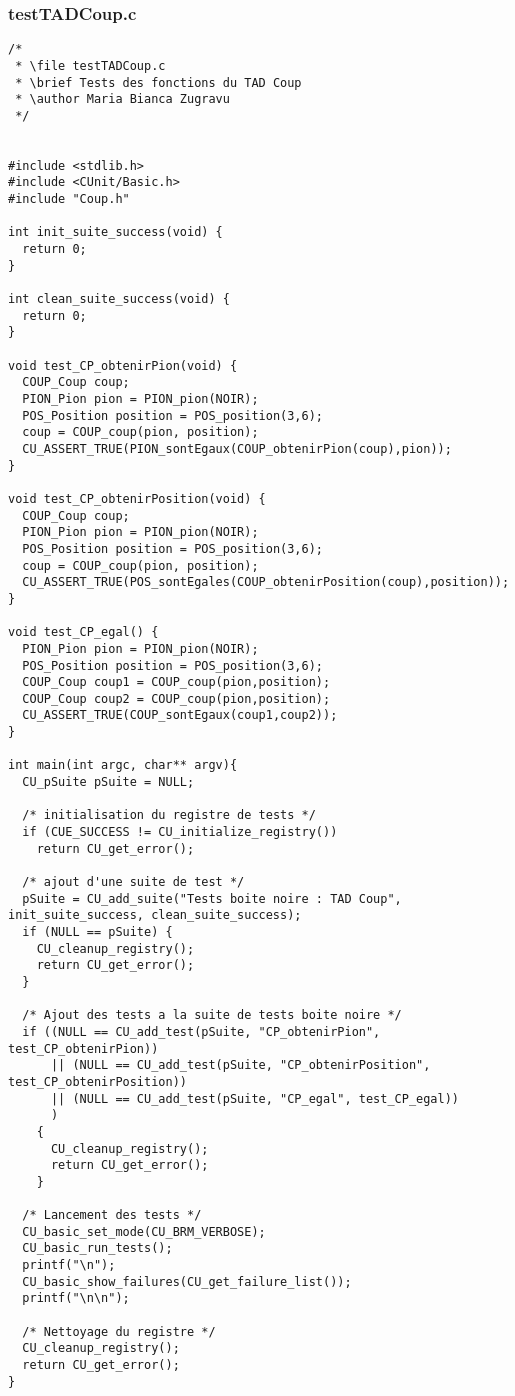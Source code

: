 \subsubsection{testTADCoup.c}
\begin{lstlisting}
/*
 * \file testTADCoup.c
 * \brief Tests des fonctions du TAD Coup
 * \author Maria Bianca Zugravu
 */


#include <stdlib.h>
#include <CUnit/Basic.h>
#include "Coup.h"

int init_suite_success(void) {
  return 0;
}

int clean_suite_success(void) {
  return 0;
}

void test_CP_obtenirPion(void) {
  COUP_Coup coup;
  PION_Pion pion = PION_pion(NOIR);
  POS_Position position = POS_position(3,6);
  coup = COUP_coup(pion, position);
  CU_ASSERT_TRUE(PION_sontEgaux(COUP_obtenirPion(coup),pion));
}

void test_CP_obtenirPosition(void) {
  COUP_Coup coup;
  PION_Pion pion = PION_pion(NOIR);
  POS_Position position = POS_position(3,6);
  coup = COUP_coup(pion, position);
  CU_ASSERT_TRUE(POS_sontEgales(COUP_obtenirPosition(coup),position));
}

void test_CP_egal() {
  PION_Pion pion = PION_pion(NOIR);
  POS_Position position = POS_position(3,6);
  COUP_Coup coup1 = COUP_coup(pion,position);
  COUP_Coup coup2 = COUP_coup(pion,position);
  CU_ASSERT_TRUE(COUP_sontEgaux(coup1,coup2));
}

int main(int argc, char** argv){
  CU_pSuite pSuite = NULL;

  /* initialisation du registre de tests */
  if (CUE_SUCCESS != CU_initialize_registry())
    return CU_get_error();

  /* ajout d'une suite de test */
  pSuite = CU_add_suite("Tests boite noire : TAD Coup", init_suite_success, clean_suite_success);
  if (NULL == pSuite) {
    CU_cleanup_registry();
    return CU_get_error();
  }

  /* Ajout des tests a la suite de tests boite noire */
  if ((NULL == CU_add_test(pSuite, "CP_obtenirPion", test_CP_obtenirPion))
      || (NULL == CU_add_test(pSuite, "CP_obtenirPosition", test_CP_obtenirPosition))
      || (NULL == CU_add_test(pSuite, "CP_egal", test_CP_egal))
      )
    {
      CU_cleanup_registry();
      return CU_get_error();
    }

  /* Lancement des tests */
  CU_basic_set_mode(CU_BRM_VERBOSE);
  CU_basic_run_tests();
  printf("\n");
  CU_basic_show_failures(CU_get_failure_list());
  printf("\n\n");

  /* Nettoyage du registre */
  CU_cleanup_registry();
  return CU_get_error();
}
\end{lstlisting}

